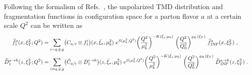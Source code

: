 \documentclass[aps,preprintnumbers,showpacs,nofootinbib,superscriptaddress,floatfix]{revtex4}
\newcommand{\bT}{\xi_T}
\newcommand{\bb}{\xi}
\begin{document}
Following the formalism of Refs.~\cite{Collins:2011zzd,Aybat:2011zv}, the
unpolarized TMD distribution and fragmentation functions in configuration
space for a parton flavor $a$ at a certain scale $Q^2$ can be written as 
\begin{align}   
\widetilde{f}_1^a (x,  \bT^2; Q^2) &= \sum_{i=q,\bar q,g} \bigl( C_{a/i} \otimes f_1^i \bigr) (x,\bar{\bb}_\ast,\mu_b^2) 
\  e^{S (\mu_b^2, Q^2)} \bigg(
\frac{Q^2}{\mu_b^2}\bigg)^{-K(\bar{\bb}_\ast;\mu_b)}
\  
\bigg(\frac{Q^2}{Q_0^2} \bigg)^{g_K(\bT)} \  \widetilde{f}_{1 {\rm NP}}^a (x, \bT^2) \ ,
\label{e:TMDevol1} \\
\widetilde{D}_1^{a\to h} (z, \bT^2; Q^2) &= \sum_{i=q,\bar q,g} \bigl(
\hat{C}_{a/i} \otimes D_1^{i\to h} \bigr) (z,\bar{\bb}_\ast, \mu_b^2) \  e^{S
  (\mu_b^2, Q^2)} \bigg(\frac{Q^2}{\mu_b^2}\bigg)^{-K(\bar{\bb}_\ast;\mu_b)}
\  
\bigg(\frac{Q^2}{Q_0^2} \bigg)^{g_K( \bT)} \  \widetilde{D}_{1 {\rm NP}}^{a\to h} (z, \bT^2) \  .
\label{e:TMDevol2}
\end{align}
\end{document}
